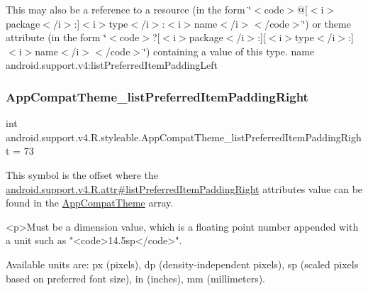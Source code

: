 This may also be a reference to a resource (in the form \char`\"{}$<$code$>$@\mbox{[}$<$i$>$package$<$/i$>$\+:\mbox{]}$<$i$>$type$<$/i$>$\+:$<$i$>$name$<$/i$>$$<$/code$>$\char`\"{}) or theme attribute (in the form \char`\"{}$<$code$>$?\mbox{[}$<$i$>$package$<$/i$>$\+:\mbox{]}\mbox{[}$<$i$>$type$<$/i$>$\+:\mbox{]}$<$i$>$name$<$/i$>$$<$/code$>$\char`\"{}) containing a value of this type.  name android.\+support.\+v4\+:list\+Preferred\+Item\+Padding\+Left \mbox{\label{classandroid_1_1support_1_1v4_1_1R_1_1styleable_af5e021a7f52cfdc13201bf047025d17d}} 
\subsubsection{\texorpdfstring{App\+Compat\+Theme\+\_\+list\+Preferred\+Item\+Padding\+Right}{AppCompatTheme\_listPreferredItemPaddingRight}}
{\footnotesize\ttfamily int android.\+support.\+v4.\+R.\+styleable.\+App\+Compat\+Theme\+\_\+list\+Preferred\+Item\+Padding\+Right = 73\hspace{0.3cm}{\ttfamily [static]}}

This symbol is the offset where the \hyperlink{classandroid_1_1support_1_1v4_1_1R_1_1attr_a5ad6e202e34a514ac5dcd675d76d5062}{android.\+support.\+v4.\+R.\+attr\#list\+Preferred\+Item\+Padding\+Right} attribute\textquotesingle{}s value can be found in the \hyperlink{classandroid_1_1support_1_1v4_1_1R_1_1styleable_ac07ebbe62ed977f6dcaadc6397840ace}{App\+Compat\+Theme} array.

\begin{DoxyVerb}      <p>Must be a dimension value, which is a floating point number appended with a unit such as "<code>14.5sp</code>".
\end{DoxyVerb}
 Available units are\+: px (pixels), dp (density-\/independent pixels), sp (scaled pixels based on preferred font size), in (inches), mm (millimeters). 


